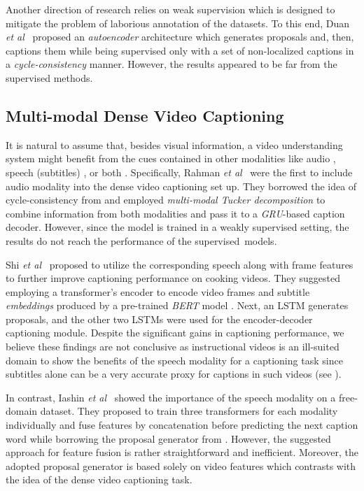 \documentclass{src/bmvc2k}
\def\etal{\emph{et al}\bmvaOneDot}
\begin{document}
Another direction of research relies on weak supervision which is designed to mitigate the problem of laborious annotation of the datasets. To this end, Duan \etal~\cite{WeaklySupervDVC_Duan_2018} proposed an \textit{autoencoder} architecture which generates proposals and, then, captions them while being supervised only with a set of non-localized captions in a \textit{cycle-consistency} manner. However, the results appeared to be far from the supervised methods.

\subsection{Multi-modal Dense Video Captioning}

It is natural to assume that, besides visual information, a video understanding system might benefit from the cues contained in other modalities like audio \cite{Rahman2019}, speech (subtitles) \cite{DenseProcCap_Shi_2019}, or both \cite{mdvc_Iashin_2020}. Specifically, Rahman \etal~\cite{Rahman2019} were the first to include audio modality into the dense video captioning set up. They borrowed the idea of cycle-consistency from \cite{WeaklySupervDVC_Duan_2018} and employed \textit{multi-modal Tucker decomposition} \cite{MUTAN_Hedi_2017} to combine information from both modalities and pass it to a \textit{GRU}-based \cite{GRU_Chung_2014} caption decoder. However, since the model is trained in a weakly supervised setting, the results do not reach the performance of the supervised~models.

Shi \etal~\cite{DenseProcCap_Shi_2019} proposed to utilize the corresponding speech along with frame features to further improve captioning performance on cooking videos. They suggested  employing a transformer's encoder to encode video frames and subtitle \textit{embeddings} produced by a pre-trained \textit{BERT} model \cite{BERT_Devlin_2018}. Next, an LSTM generates proposals, and the other two LSTMs were used for the encoder-decoder captioning module. Despite the significant gains in captioning performance, we believe these findings are not conclusive as instructional videos is an ill-suited domain to show the benefits of the speech modality for a captioning task since subtitles alone can be a very accurate proxy for captions in such videos (see \cite{HowTo100M_Miech2019}).

In contrast, Iashin \etal~\cite{mdvc_Iashin_2020} showed the importance of the speech modality on a free-domain dataset. They proposed to train three transformers for each modality individually and fuse features by concatenation before predicting the next caption word while borrowing the proposal generator from \cite{bafcg_Wang2018n}. However, the suggested approach for feature fusion is rather straightforward and inefficient. Moreover, the adopted proposal generator is based solely on video features which contrasts with the idea of the dense video captioning task.
\end{document}
